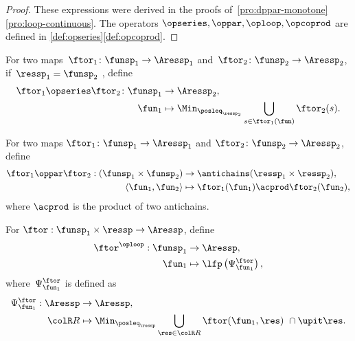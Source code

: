 \begin{proof}
  These expressions were derived in the proofs of~\cref{pro:dppar-monotone}\textendash\ref{pro:loop-continuous}.
  The operators $\opseries,\oppar,\oploop,\opcoprod$ are defined
  in \cref{def:opseries}\textendash\ref{def:opcoprod}.
\end{proof}
\begin{definition}
  \label{def:opseries}
  For two maps~$\ftor_{1}\colon\funsp_{1}\rightarrow\Aressp_{1}$
  and~$\ftor_{2}\colon\funsp_{2}\rightarrow\Aressp_{2}$, if~$\ressp_{1}=\funsp_{2}$
  , define
  \begin{align*}
  {\displaystyle \ftor_{1}\opseries\ftor_{2}\colon\funsp_{1}}
    & \rightarrow\Aressp_{2},\\
    \fun_{1} & \mapsto\Min_{\posleq_{\ressp_{2}}}\bigcup_{s\in\ftor_{1}(\fun)}\ftor_{2}(s).
  \end{align*}
\end{definition}

\begin{definition}
  \label{def:opmaps}
  For two maps $\ftor_{1}\colon\funsp_{1}\rightarrow\Aressp_{1}$
  and $\ftor_{2}\colon\funsp_{2}\rightarrow\Aressp_{2}$, define
  \begin{align}
    \ftor_{1}\oppar\ftor_{2}:(\funsp_{1}\times\funsp_{2}) & \rightarrow\antichains(\ressp_{1}\times\ressp_{2}),\label{eq:oppar}\\
    \left\langle \fun_{1},\fun_{2}\right\rangle  & \mapsto\ftor_{1}(\fun_{1})\acprod\ftor_{2}(\fun_{2}),\nonumber
  \end{align}
  where $\acprod$ is the product of two antichains.
\end{definition}

\begin{definition}
  \label{def:oploop}
  For $\ftor:\funsp_{1}\times\ressp\rightarrow\Aressp$,
  define
  \begin{align}
    \ftor^{\oploop}:\funsp_{1} & \rightarrow\Aressp,\nonumber \\
    \fun_{1} & \mapsto\lfp\left(\Psi_{\fun_{1}}^{\ftor}\right),\label{eq:lfp}
  \end{align}
  where~$\Psi_{\fun_{1}}^{\ftor}$ is defined as
  \begin{align}
    \Psi_{\fun_{1}}^{\ftor}:\Aressp & \rightarrow\Aressp,\nonumber \\
    {\colR R} & \mapsto\Min_{\posleq_{\ressp}}\bigcup_{\res\in{\colR R}}\ftor(\fun_{1},\res)\ \cap\upit\res.\label{eq:phi}
  \end{align}
\end{definition}

